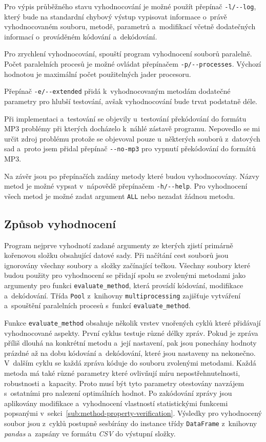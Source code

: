 Pro výpis průběžného stavu vyhodnocování je možné použít přepínač
\verb|-l/--log|, který bude na standardní chybový výstup vypisovat informace
o~právě vyhodnocovaném souboru, metodě, parametrů a~modifikací včetně
dodatečných informací o~prováděném kódování a~dekódování.

Pro zrychlení vyhodnocování, spouští program vyhodnocení souborů paralelně.
Počet paralelních procesů je možné ovládat přepínačem \verb|-p/--processes|.
Výchozí hodnotou je maximální počet použitelných jader procesoru.

Přepínač \verb|-e/--extended| přidá k~vyhodnocovaným metodám dodatečné
parametry pro hlubší testování, avšak vyhodnocování bude trvat podstatně déle.

Při implementaci a~testování se objevily u~testování překódování do formátu MP3
problémy při kterých docházelo k~náhlé zástavě programu. Nepovedlo se mi určit
zdroj problému protože se objevoval pouze u~některých souborů z~datových sad
a~proto jsem přidal přepínač \verb|--no-mp3| pro vypnutí překódování do formátů
MP3.

Na závěr jsou po přepínačích zadány metody které budou vyhodnocovány. Názvy
metod je možné vypsat v~nápovědě přepínačem \verb|-h/--help|. Pro vyhodnocení
všech metod je možné zadat argument \texttt{ALL} nebo nezadat žádnou metodu.

\subsection*{Způsob vyhodnocení}
\label{sub:evaluation-program}

Program nejprve vyhodnotí zadané argumenty ze kterých zjistí primárně kořenovou
složku obsahující datové sady. Při načítání cest souborů jsou ignorovány
všechny soubory a~složky začínající tečkou. Všechny soubory které budou použity
pro vyhodnocení se přidají spolu se zvolenými metodami jako argumenty pro
funkci \texttt{evaluate\_method}, která provádí kódování, modifikace
a~dekódování. Třída \texttt{Pool} z~knihovny \texttt{multiprocessing} zajišťuje
vytváření a~spouštění paralelních procesů s~funkcí \texttt{evaluate\_method}.

Funkce \texttt{evaluate\_method} obsahuje několik vrstev vnořených cyklů které
přidávají vyhodnocované aspekty. První cyklus testuje různé délky zpráv. Pokud
je zpráva příliš dlouhá na konkrétní metodu a~její nastavení, pak jsou
ponechány hodnoty prázdné až na dobu kódování a~dekódování, které jsou
nastaveny na nekonečno. V~dalším cyklu se každá zpráva kóduje do souboru
zvolenými metodami. Každá metoda má také různé parametry které ovlivňují míru
nepostřehnutelnosti, robustnosti a~kapacity. Proto musí být tyto parametry
otestovány navzájem s~ostatními pro nalezení optimálních hodnot. Po zakódování
zprávy jsou aplikovány modifikace a~vyhodnocení vlastností statistickými
funkcemi popsanými v~sekci~\ref{sub:method-property-verification}. Výsledky pro
vyhodnocený soubor jsou z~cyklů postupně sesbírány do instance třídy
\texttt{DataFrame} z~knihovny \textit{pandas} a~zapsány ve formátu \textit{CSV}
do výstupní složky.

